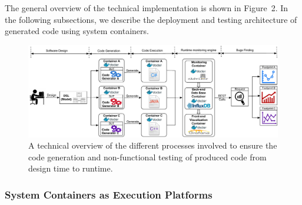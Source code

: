 The general overview of the technical implementation is shown in Figure~2. In the following subsections, we describe the deployment and testing architecture of generated code using system containers.


\begin{figure}[!h]
	\center
	\includegraphics[width=0.95\linewidth]{Ressources/background2.pdf}
	\caption{A technical overview of the different processes involved to ensure the code generation and non-functional testing of produced code from design time to runtime.}
\end{figure}


\subsubsection{System Containers as Execution Platforms}






